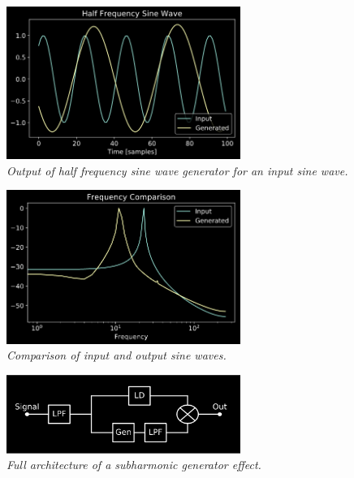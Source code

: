 \documentclass[twoside,a4paper]{article}
\begin{document}
%
\begin{figure}[!htb]
    \center
    \includegraphics[width=3in]{../Subharmonics/Pics/half_sine.png}
    \caption{\label{sine_half}{\it Output of half frequency sine wave generator for an input sine wave.}}
\end{figure}
%
\begin{figure}[!htb]
    \center
    \includegraphics[width=3in]{../Subharmonics/Pics/freq_compare.png}
    \caption{\label{freq_compare}{\it Comparison of input and output sine waves.}}
\end{figure}
%
\begin{figure}[!htb]
    \center
    \includegraphics[width=3in]{../Subharmonics/Pics/full_arch.png}
    \caption{\label{sub_arch}{\it Full architecture of a subharmonic generator effect.}}
\end{figure}
%
\end{document}
